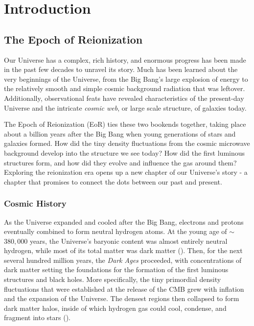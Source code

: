 \chapter{Introduction}
\label{c.intro}

\section{The Epoch of Reionization}

Our Universe has a complex, rich history, and enormous progress has been made in the past few decades to unravel its story. Much has been learned about the very beginnings of the Universe, from the Big Bang's large explosion of energy to the relatively smooth and simple cosmic background radiation that was leftover. Additionally, observational feats have revealed characteristics of the present-day Universe and the intricate \textit{cosmic web}, or large scale structure, of galaxies today. 

The Epoch of Reionization (EoR) ties these two bookends together, taking place about a billion years after the Big Bang when young generations of stars and galaxies formed. How did the tiny density fluctuations from the cosmic microwave background develop into the structure we see today? How did the first luminous structures form, and how did they evolve and influence the gas around them? Exploring the reionization era opens up a new chapter of our Universe's story - a chapter that promises to connect the dots between our past and present.

\subsection{Cosmic History}

As the Universe expanded and cooled after the Big Bang, electrons and protons eventually combined to form neutral hydrogen atoms. At the young age of $\sim$ $380,000$ years, the Universe's baryonic content was almost entirely neutral hydrogen, while most of its total matter was dark matter (\citealt{loeb_furlanetto_2013}). Then, for the next several hundred million years, the \textit{Dark Ages} proceeded, with concentrations of dark matter setting the foundations for the formation of the first luminous structures and black holes. More specifically, the tiny primordial density fluctuations that were established at the release of the CMB grew with inflation and the expansion of the Universe. The densest regions then collapsed to form dark matter halos, inside of which hydrogen gas could cool, condense, and fragment into stars (\citealt{dodelson_cosmology}).

